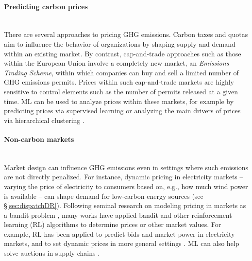 \documentclass[11pt]{report}
\newcommand{\Gap}{\texorpdfstring{\hfill}{}}
\begin{document}
\paragraph*{Predicting carbon prices}\Gap\mbox{}\\
There are several approaches to pricing GHG emissions. Carbon taxes and quotas aim to influence the behavior of organizations by shaping supply and demand within an existing market. By contrast, cap-and-trade approaches such as those within the European Union involve a completely new market, an \emph{Emissions Trading Scheme}, within which companies can buy and sell a limited number of GHG emissions permits.
Prices within such cap-and-trade markets are highly sensitive to control elements such as the number of permits released at a given time. 
ML can be used to analyze prices within these markets, for example by predicting prices via supervised learning \cite{zhu2017forecasting,sun2018analysis,zhu2018novel,wei} or analyzing the main drivers of prices via hierarchical clustering \cite{zhu2015carbon}.

\paragraph*{Non-carbon markets}\Gap\mbox{}\\
Market design can influence GHG emissions even in settings where such emissions are not directly penalized. For instance, dynamic pricing in electricity markets -- varying the price of electricity to consumers based on, e.g.,  how much wind power is available -- can shape demand for low-carbon energy sources (see \S\ref{sec:dispatchDR}). 
Following seminal research on modeling pricing in markets as a bandit problem \cite{rothschild}, many works have applied bandit and other reinforcement learning (RL) algorithms to determine prices or other market values. For example, RL has been applied to predict bids \cite{ragupathi} and market power \cite{nanduri} in electricity markets, and to set dynamic prices in more general settings 
\cite{maestre}. ML can also help solve auctions in supply chains \cite{Sandholm_very-large-scalegeneralized}.
\end{document}
